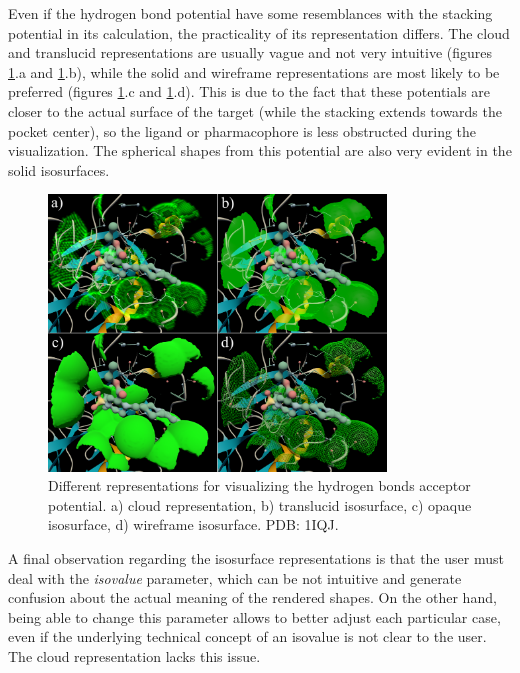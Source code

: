     Even if the hydrogen bond potential have some resemblances with the stacking potential in its calculation, the practicality of its representation differs. The cloud and translucid representations are usually vague and not very intuitive (figures \ref{fig:results/reprs_2}.a and \ref{fig:results/reprs_2}.b), while the solid and wireframe representations are most likely to be preferred (figures \ref{fig:results/reprs_2}.c and \ref{fig:results/reprs_2}.d). This is due to the fact that these potentials are closer to the actual surface of the target (while the stacking extends towards the pocket center), so the ligand or pharmacophore is less obstructed during the visualization. The spherical shapes from this potential are also very evident in the solid isosurfaces.

    \begin{figure}[H]
      \centering
      \includegraphics[width=0.8\textwidth]{figures/results/reprs_2.png}
      \caption{\label{fig:results/reprs_2} Different representations for visualizing the hydrogen bonds acceptor potential. a) cloud representation, b) translucid isosurface, c) opaque isosurface, d) wireframe isosurface. PDB: 1IQJ.}
    \end{figure}

    A final observation regarding the isosurface representations is that the user must deal with the \textit{isovalue} parameter, which can be not intuitive and generate confusion about the actual meaning of the rendered shapes. On the other hand, being able to change this parameter allows to better adjust each particular case, even if the underlying technical concept of an isovalue is not clear to the user. The cloud representation lacks this issue.


